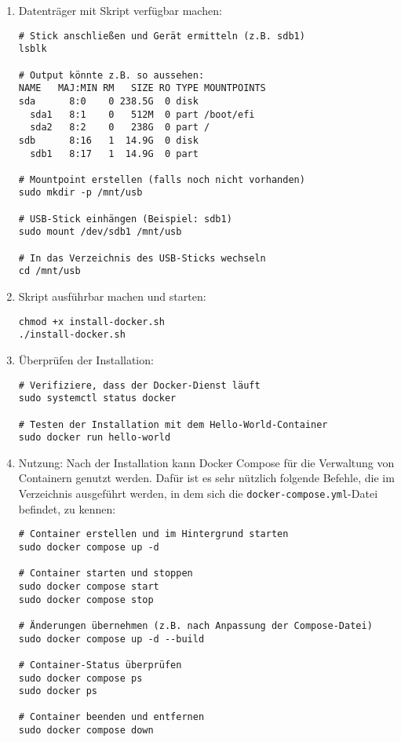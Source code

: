 \documentclass[12pt,a4paper]{report}
\begin{document}
  \begin{enumerate}
    \item Datenträger mit Skript verfügbar machen:
    \begin{verbatim}
# Stick anschließen und Gerät ermitteln (z.B. sdb1)
lsblk

# Output könnte z.B. so aussehen:
NAME   MAJ:MIN RM   SIZE RO TYPE MOUNTPOINTS
sda      8:0    0 238.5G  0 disk
  sda1   8:1    0   512M  0 part /boot/efi
  sda2   8:2    0   238G  0 part /
sdb      8:16   1  14.9G  0 disk
  sdb1   8:17   1  14.9G  0 part

# Mountpoint erstellen (falls noch nicht vorhanden)
sudo mkdir -p /mnt/usb

# USB-Stick einhängen (Beispiel: sdb1)
sudo mount /dev/sdb1 /mnt/usb

# In das Verzeichnis des USB-Sticks wechseln
cd /mnt/usb
    \end{verbatim}

    \item Skript ausführbar machen und starten:
    \begin{verbatim}
chmod +x install-docker.sh
./install-docker.sh
    \end{verbatim}

    \item Überprüfen der Installation:
    \begin{verbatim}
# Verifiziere, dass der Docker-Dienst läuft
sudo systemctl status docker

# Testen der Installation mit dem Hello-World-Container
sudo docker run hello-world
    \end{verbatim}
  
    \item Nutzung:
    Nach der Installation kann Docker Compose für die Verwaltung von Containern genutzt werden.  
    Dafür ist es sehr nützlich folgende Befehle, die im Verzeichnis ausgeführt werden, 
    in dem sich die \texttt{docker-compose.yml}-Datei befindet, zu kennen:

    \begin{verbatim}
# Container erstellen und im Hintergrund starten
sudo docker compose up -d

# Container starten und stoppen
sudo docker compose start
sudo docker compose stop

# Änderungen übernehmen (z.B. nach Anpassung der Compose-Datei)
sudo docker compose up -d --build

# Container-Status überprüfen
sudo docker compose ps
sudo docker ps

# Container beenden und entfernen
sudo docker compose down
    \end{verbatim}
  \end{enumerate}
\end{document}
